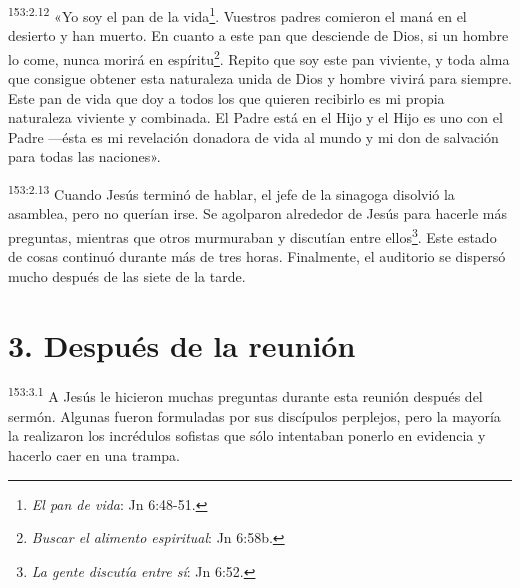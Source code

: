 \par
\textsuperscript{153:2.12} «Yo soy el pan de la vida\footnote{\textit{El pan de vida}: Jn 6:48-51.}. Vuestros padres comieron el maná en el desierto y han muerto. En cuanto a este pan que desciende de Dios, si un hombre lo come, nunca morirá en espíritu\footnote{\textit{Buscar el alimento espiritual}: Jn 6:58b.}. Repito que soy este pan viviente, y toda alma que consigue obtener esta naturaleza unida de Dios y hombre vivirá para siempre. Este pan de vida que doy a todos los que quieren recibirlo es mi propia naturaleza viviente y combinada. El Padre está en el Hijo y el Hijo es uno con el Padre ---ésta es mi revelación donadora de vida al mundo y mi don de salvación para todas las naciones».

\par
\textsuperscript{153:2.13} Cuando Jesús terminó de hablar, el jefe de la sinagoga disolvió la asamblea, pero no querían irse. Se agolparon alrededor de Jesús para hacerle más preguntas, mientras que otros murmuraban y discutían entre ellos\footnote{\textit{La gente discutía entre sí}: Jn 6:52.}. Este estado de cosas continuó durante más de tres horas. Finalmente, el auditorio se dispersó mucho después de las siete de la tarde.

\section*{3. Después de la reunión}
\par
\textsuperscript{153:3.1} A Jesús le hicieron muchas preguntas durante esta reunión después del sermón. Algunas fueron formuladas por sus discípulos perplejos, pero la mayoría la realizaron los incrédulos sofistas que sólo intentaban ponerlo en evidencia y hacerlo caer en una trampa.

